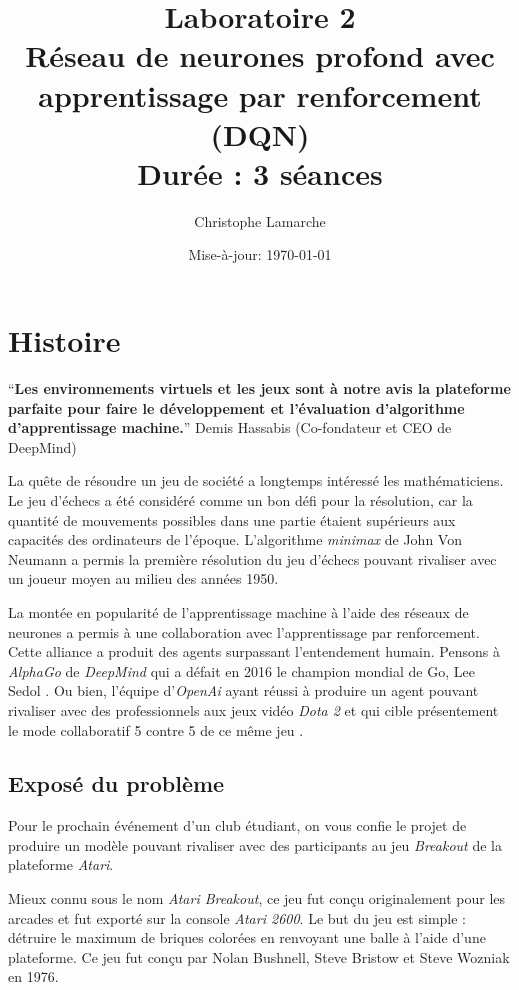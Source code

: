 \documentclass{article}
\title{Laboratoire 2\\
  \large Réseau de neurones profond avec apprentissage par renforcement (DQN)\\
  \normalsize Durée : 3 séances}
\author{Christophe Lamarche}
\date{Mise-à-jour: \today}
\begin{document}
\maketitle

\section{Histoire}

\begin{displayquote}
  \begin{center}
    ``\textbf{Les environnements virtuels et les jeux sont à notre avis la plateforme parfaite pour faire le développement et l'évaluation d'algorithme d'apprentissage machine.}'' \smallbreak
    Demis Hassabis (Co-fondateur et CEO de DeepMind) \citep{AlphaGo-movie}
  \end{center}
\end{displayquote}
\smallbreak

La quête de résoudre un jeu de société a longtemps intéressé les mathématiciens. Le jeu d'échecs a été considéré comme un bon défi pour la résolution, car la quantité de mouvements possibles dans une partie étaient supérieurs aux capacités des ordinateurs de l'époque. \citep{Chess-Ai} L'algorithme \textit{minimax} de John Von Neumann \citep{Von-Neumann} a permis la première résolution du jeu d'échecs pouvant rivaliser avec un joueur moyen au milieu des années 1950.

\bigbreak
La montée en popularité de l'apprentissage machine à l'aide des réseaux de neurones a permis à une collaboration avec l'apprentissage par renforcement. Cette alliance a produit des agents surpassant l'entendement humain. Pensons à \textit{AlphaGo} de \textit{DeepMind} qui a défait en 2016 le champion mondial de Go, Lee Sedol \citep{AlphaGo-movie}. Ou bien, l'équipe d'\textit{OpenAi} ayant réussi à produire un agent pouvant rivaliser avec des professionnels aux jeux vidéo \textit{Dota 2} \citep{OpenAi-Dota} et qui cible présentement le mode collaboratif 5 contre 5 de ce même jeu \citep{OpenAi-Five}.

\subsection{Exposé du problème}
Pour le prochain événement d'un club étudiant, on vous confie le projet de produire un modèle pouvant rivaliser avec des participants au jeu \textit{Breakout} de la plateforme \textit{Atari}.

\bigbreak
Mieux connu sous le nom \textit{Atari Breakout}, ce jeu fut conçu originalement pour les arcades et fut exporté sur la console \textit{Atari 2600}. Le but du jeu est simple : détruire le maximum de briques colorées en renvoyant une balle à l'aide d'une plateforme. Ce jeu fut conçu par Nolan Bushnell, Steve Bristow et Steve Wozniak en 1976.
\end{document}
